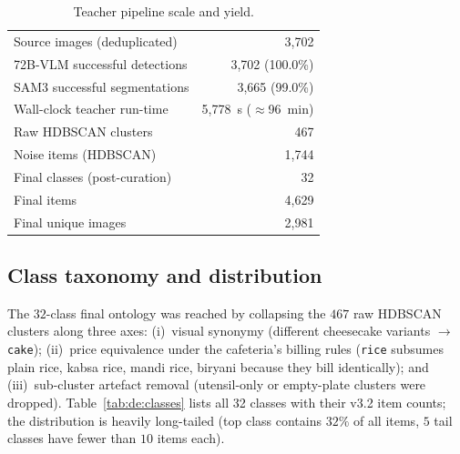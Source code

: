 \begin{table}[t]
\centering\small
\begin{tabular}{l r}
\toprule
Source images (deduplicated)         & 3{,}702 \\
72B-VLM successful detections        & 3{,}702 (100.0\%) \\
SAM3 successful segmentations        & 3{,}665 (99.0\%) \\
Wall-clock teacher run-time          & 5{,}778~s ($\approx$96~min) \\
Raw HDBSCAN clusters                 & 467 \\
Noise items (HDBSCAN)                & 1{,}744 \\
Final classes (post-curation)        & 32 \\
Final items                          & 4{,}629 \\
Final unique images                  & 2{,}981 \\
\bottomrule
\end{tabular}
\caption{Teacher pipeline scale and yield.}
\label{tab:de:scale}
\end{table}

\subsection{Class taxonomy and distribution}
\label{sec:de:taxonomy}

The $32$-class final ontology was reached by collapsing the $467$ raw
HDBSCAN clusters along three axes: (i)~visual synonymy (different
cheesecake variants $\rightarrow$ \texttt{cake}); (ii)~price equivalence
under the cafeteria's billing rules (\texttt{rice} subsumes plain rice,
kabsa rice, mandi rice, biryani because they bill identically); and
(iii)~sub-cluster artefact removal (utensil-only or empty-plate clusters
were dropped). Table~\ref{tab:de:classes} lists all 32 classes with their
v3.2 item counts; the distribution is heavily long-tailed (top class
contains $32\%$ of all items, $5$ tail classes have fewer than $10$
items each).

